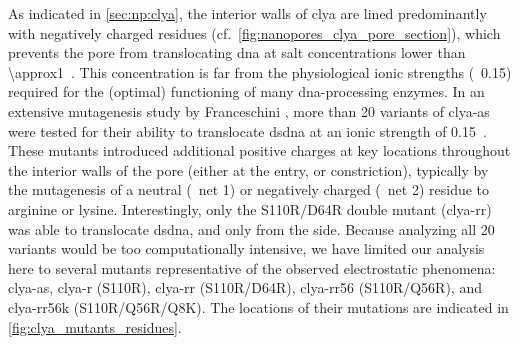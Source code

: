 As indicated in \cref{sec:np:clya}, the interior walls of \gls{clya} are lined predominantly with negatively
charged residues (cf.~\cref{fig:nanopores_clya_pore_section}), which prevents the pore from translocating
\gls{dna} at salt concentrations lower than \SI{\approx1}{\Molar}~\cite{Franceschini-2013,Franceschini-2016}.
This concentration is far from the physiological ionic strengths (\ie~\SI{0.15}{\Molar}) required for the
(optimal) functioning of many \gls{dna}-processing enzymes. In an extensive mutagenesis study by Franceschini
\etal, more than 20 variants of \gls{clya-as} were tested for their ability to translocate \gls{dsdna} at an
ionic strength of \SI{0.15}{\Molar}~\cite{Franceschini-2016}. These mutants introduced additional positive
charges at key locations throughout the interior walls of the pore (either at the \cisi{} entry, \lumen{} or
\transi{} constriction), typically by the mutagenesis of a neutral (\ie~net \SI{+1}{\ec}) or negatively
charged (\ie~net \SI{+2}{\ec}) residue to arginine or lysine. Interestingly, only the S110R/D64R double mutant
(\gls{clya-rr}) was able to translocate \gls{dsdna}, and only from the \cisi{} side. Because analyzing all 20
variants would be too computationally intensive, we have limited our analysis here to several mutants
representative of the observed electrostatic phenomena: \gls{clya-as}, \gls{clya-r} (S110R), \gls{clya-rr}
(S110R/D64R), \gls{clya-rr56} (S110R/Q56R), and \gls{clya-rr56k} (S110R/Q56R/Q8K). The locations of their
mutations are indicated in \cref{fig:clya_mutants_residues}.

